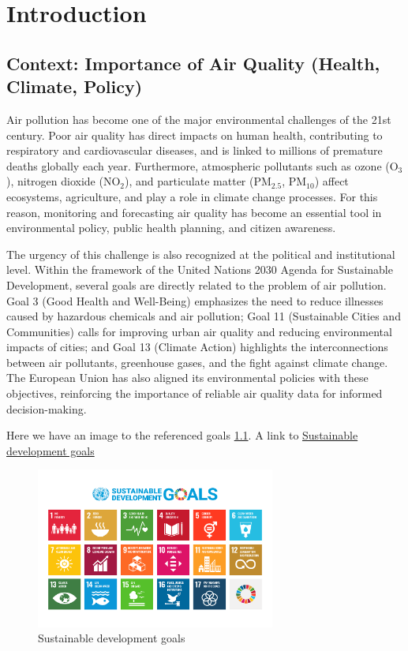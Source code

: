 \chapter[Introduction]{Introduction}
\label{chap:intro}






\section{Context: Importance of Air Quality (Health, Climate, Policy)}
Air pollution has become one of the major environmental challenges of the 21st century. Poor air quality has direct impacts on human health, contributing to respiratory and cardiovascular diseases, and is linked to millions of premature deaths globally each year. Furthermore, atmospheric pollutants such as ozone (O$_3$), nitrogen dioxide (NO$_2$), and particulate matter (PM$_{2.5}$, PM$_{10}$) affect ecosystems, agriculture, and play a role in climate change processes. For this reason, monitoring and forecasting air quality has become an essential tool in environmental policy, public health planning, and citizen awareness.  

The urgency of this challenge is also recognized at the political and institutional level. Within the framework of the United Nations 2030 Agenda for Sustainable Development, several goals are directly related to the problem of air pollution. Goal 3 (Good Health and Well-Being) emphasizes the need to reduce illnesses caused by hazardous chemicals and air pollution; Goal 11 (Sustainable Cities and Communities) calls for improving urban air quality and reducing environmental impacts of cities; and Goal 13 (Climate Action) highlights the interconnections between air pollutants, greenhouse gases, and the fight against climate change. The European Union has also aligned its environmental policies with these objectives, reinforcing the importance of reliable air quality data for informed decision-making.


Here we have an image to the referenced goals \ref{fig:ej1}. A link to \href{https://sdgs.un.org/goals}{Sustainable development goals}%


\begin{figure} [h!btp]
	\centering
	\includegraphics[width=0.7\textwidth]{fig/sustainable-image.png}
	\caption[Sustainable development goals]{Sustainable development goals\footnotemark}
	\label{fig:ej1}
\end{figure}

